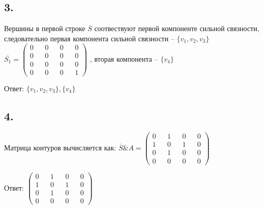 \documentclass[a4paper,12pt]{article} %
\begin{document}
\subsection*{3.}
Вершины в первой строке $\overline{S}$ соотвествуют первой компоненте сильной связности,
следовательно первая компонента сильной связности -- $\{v_1, v_2, v_3\}$ \Rightarrow
$
\overline{S_1}
=
\begin{pmatrix}
  0 && 0 && 0 && 0 \\
  0 && 0 && 0 && 0 \\
  0 && 0 && 0 && 0 \\
  0 && 0 && 0 && 1
\end{pmatrix}
$
, вторая компонента -- $\{v_4\}$

Ответ:
$
\{v_1, v_2, v_3\}, \{v_4\}
$

\subsection*{4.}
Матрица контуров вычисляется как:
$
\overline{S} \& A
=
\begin{pmatrix}
  0 && 1 && 0 && 0 \\
  1 && 0 && 1 && 0 \\
  0 && 1 && 0 && 0 \\
  0 && 0 && 0 && 0
\end{pmatrix}
$

Ответ:
$
\begin{pmatrix}
  0 && 1 && 0 && 0 \\
  1 && 0 && 1 && 0 \\
  0 && 1 && 0 && 0 \\
  0 && 0 && 0 && 0
\end{pmatrix}
$
\end{document}
